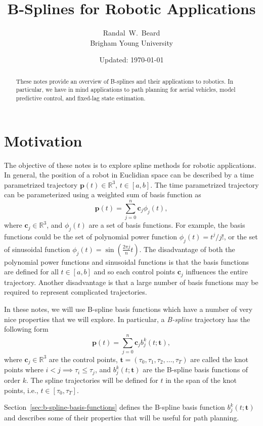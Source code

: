 \documentclass{article}
\title{\LARGE \bf
B-Splines for Robotic Applications
}
\date{Updated: \today}
\author{Randal~W.~Beard \\ Brigham Young University}
\newcommand{\cbf}{\mathbf{c}}
\begin{document}
\maketitle

\begin{abstract}
These notes provide an overview of B-splines and their applications to robotics.  In particular, we have in mind applications to path planning for aerial vehicles, model predictive control, and fixed-lag state estimation.  
\end{abstract}

\section{Motivation}

The objective of these notes is to explore spline methods for robotic applications. In general, the position of a robot in Euclidian space can be described by a time parametrized trajectory $\mathbf{p}(t)\in\mathbb{R}^3$, $t\in[a,b]$.  The time parametrized trajectory can be parameterized using a weighted sum of basis function as
\[
\mathbf{p}(t) = \sum_{j=0}^{n} \cbf_j \phi_j(t),
\]
where $\cbf_j\in\mathbb{R}^3$, and $\phi_j(t)$ are a set of basis functions.  For example, the basis functions could be the set of polynomial power function $\phi_j(t) = t^j/j!$, or the set of sinusoidal function $\phi_j(t) = \sin(\frac{2\pi j}{n}t)$.  The disadvantage of both the polynomial power functions and sinusoidal functions is that the basis functions are defined for all $t\in[a,b]$ and so each control points $\mathbf{c}_j$ influences the entire trajectory.  Another disadvantage is that a large number of basis functions may be required to represent complicated trajectories.  

In these notes, we will use B-spline basis functions which have a number of very nice properties that we will explore.  In particular, a {\em B-spline} trajectory has the following form
\[
\mathbf{p}(t) = \sum_{j=0}^{n} \cbf_j b_j^k(t;\mathbf{t}),
\]
where $\cbf_j\in\mathbb{R}^3$ are the control points,  $\mathbf{t}=(\tau_0, \tau_1, \tau_2, \dots, \tau_T)$ are called the knot points where $i<j \implies \tau_i\leq \tau_j$, and $b_j^k(t;\mathbf{t})$ are the B-spline basis functions of order $k$. The spline trajectories will be defined for $t$ in the span of the knot points, i.e., $t\in[\tau_0, \tau_T]$.  

Section~\ref{sec:b-spline-basis-functions} defines the B-spline basis function $b_j^k(t; \mathbf{t})$ and describes some of their properties that will be useful for path planning.
\end{document}

